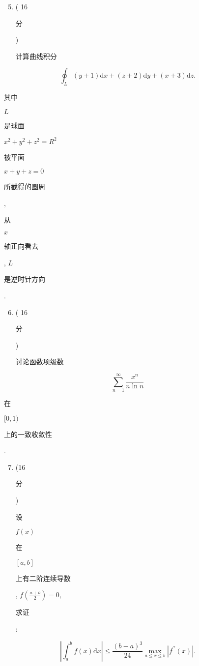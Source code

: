 \documentclass[10pt]{article}
\begin{document}
\begin{enumerate}
  \setcounter{enumi}{4}
  \item ( 16 \begin{CJK}{UTF8}{mj}分\end{CJK}) \begin{CJK}{UTF8}{mj}计算曲线积分\end{CJK}
\end{enumerate}
$$
\oint_{L}(y+1) \mathrm{d} x+(z+2) \mathrm{d} y+(x+3) \mathrm{d} z .
$$
\begin{CJK}{UTF8}{mj}其中\end{CJK} $L$ \begin{CJK}{UTF8}{mj}是球面\end{CJK} $x^{2}+y^{2}+z^{2}=R^{2}$ \begin{CJK}{UTF8}{mj}被平面\end{CJK} $x+y+z=0$ \begin{CJK}{UTF8}{mj}所截得的圆周\end{CJK}, \begin{CJK}{UTF8}{mj}从\end{CJK} $x$ \begin{CJK}{UTF8}{mj}轴正向看去\end{CJK}, $L$ \begin{CJK}{UTF8}{mj}是逆时针方向\end{CJK}.

\begin{enumerate}
  \setcounter{enumi}{5}
  \item ( 16 \begin{CJK}{UTF8}{mj}分\end{CJK}) \begin{CJK}{UTF8}{mj}讨论函数项级数\end{CJK}
\end{enumerate}
$$
\sum_{n=1}^{\infty} \frac{x^{n}}{n \ln n}
$$
\begin{CJK}{UTF8}{mj}在\end{CJK} $[0,1)$ \begin{CJK}{UTF8}{mj}上的一致收敛性\end{CJK}.

\begin{enumerate}
  \setcounter{enumi}{6}
  \item (16 \begin{CJK}{UTF8}{mj}分\end{CJK}) \begin{CJK}{UTF8}{mj}设\end{CJK} $f(x)$ \begin{CJK}{UTF8}{mj}在\end{CJK} $[a, b]$ \begin{CJK}{UTF8}{mj}上有二阶连续导数\end{CJK}, $f\left(\frac{a+b}{2}\right)=0$, \begin{CJK}{UTF8}{mj}求证\end{CJK}:
\end{enumerate}
$$
\left|\int_{a}^{b} f(x) \mathrm{d} x\right| \leq \frac{(b-a)^{3}}{24} \max _{a \leq x \leq b}\left|f^{\prime \prime}(x)\right| .
$$
\end{document}
